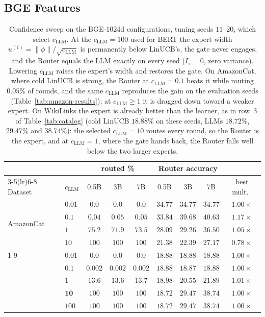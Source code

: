 \documentclass[anon]{alt2027} %
\begin{document}
\subsection{BGE Features}
\label{app:bge}

\begin{table}[h]
\centering
\caption{Confidence sweep on the BGE-1024d configurations, tuning seeds
$11$--$20$, which select $c_{\mathrm{LLM}}$. At the
$c_{\mathrm{LLM}}=100$ used for BERT the expert width $u^{(1)}=\|\phi\|/\sqrt{c_{\mathrm{LLM}}}$ is
permanently below LinUCB's, the gate never engages, and the Router equals the
LLM exactly on every seed ($I_\tau=0$, zero variance). Lowering $c_{\mathrm{LLM}}$ raises the
expert's width and restores the gate. On AmazonCat, where cold LinUCB is
strong, the Router at $c_{\mathrm{LLM}}=0.1$ beats it while routing $0.05\%$ of rounds, and
the same $c_{\mathrm{LLM}}$ reproduces the gain on the evaluation seeds
(Table~\ref{tab:amazon-results}); at $c_{\mathrm{LLM}}\ge1$ it is dragged down toward a
weaker expert. On WikiLinks the expert is
already better than the learner, as in row~3 of Table~\ref{tab:catalog} (cold
LinUCB $18.88\%$ on these seeds, LLMs $18.72\%$, $29.47\%$ and $38.74\%$): the
selected $c_{\mathrm{LLM}}=10$ routes every round, so the Router is the expert, and at
$c_{\mathrm{LLM}}=1$, where the gate hands back, the Router falls well below the two
larger experts.}
\label{tab:bge-csweep}
\scriptsize
\setlength{\tabcolsep}{4pt}
\begin{tabular}{@{}llccccccc@{}}
\toprule
& & \multicolumn{3}{c}{routed \%} & \multicolumn{3}{c}{Router accuracy} & \\
\cmidrule(lr){3-5}\cmidrule(lr){6-8}
Dataset & $c_{\mathrm{LLM}}$ & 0.5B & 3B & 7B & 0.5B & 3B & 7B & best mult.\ \\
\midrule
\multirow{4}{*}{AmazonCat} & $0.01$ & $0.0$ & $0.0$ & $0.0$ & $34.77$ & $34.77$ & $34.77$ & $1.00\times$ \\
 & $\mathbf{0.1}$ & $0.04$ & $0.05$ & $0.05$ & $33.84$ & $39.68$ & $\mathbf{40.63}$ & $\mathbf{1.17\times}$ \\
 & $1$  & $75.2$ & $71.9$ & $73.5$ & $28.09$ & $29.26$ & $36.50$ & $1.05\times$ \\
 & $10$ & $100$ & $100$ & $100$ & $21.38$ & $22.39$ & $27.17$ & $0.78\times$ \\
\cmidrule(lr){1-9}
\multirow{5}{*}{WikiLinks} & $0.01$ & $0.0$ & $0.0$ & $0.0$ & $18.88$ & $18.88$ & $18.88$ & $1.00\times$ \\
 & $0.1$ & $0.002$ & $0.002$ & $0.002$ & $18.88$ & $18.87$ & $18.88$ & $1.00\times$ \\
 & $1$  & $13.6$ & $13.6$ & $13.7$ & $18.98$ & $20.55$ & $21.89$ & $1.01\times$ \\
 & $\mathbf{10}$ & $100$ & $100$ & $100$ & $18.72$ & $29.47$ & $\mathbf{38.74}$ & $1.00\times$ \\
 & $100$ & $100$ & $100$ & $100$ & $18.72$ & $29.47$ & $38.74$ & $1.00\times$ \\
\bottomrule
\end{tabular}
\end{table}
\end{document}
